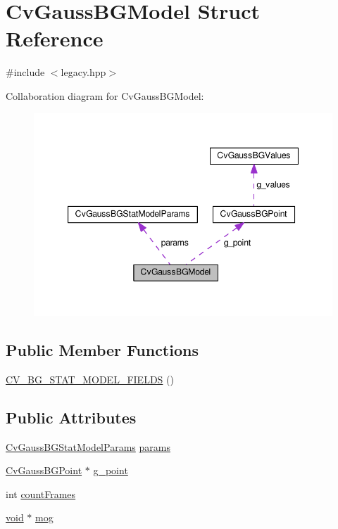 \hypertarget{structCvGaussBGModel}{\section{Cv\-Gauss\-B\-G\-Model Struct Reference}
\label{structCvGaussBGModel}
}


{\ttfamily \#include $<$legacy.\-hpp$>$}



Collaboration diagram for Cv\-Gauss\-B\-G\-Model\-:\nopagebreak
\begin{figure}[H]
\begin{center}
\leavevmode
\includegraphics[width=347pt]{structCvGaussBGModel__coll__graph}
\end{center}
\end{figure}
\subsection*{Public Member Functions}
\begin{DoxyCompactItemize}
\item 
\hyperlink{structCvGaussBGModel_aa5ecb4c83e07301bc3b6f357d6b6e8ac}{C\-V\-\_\-\-B\-G\-\_\-\-S\-T\-A\-T\-\_\-\-M\-O\-D\-E\-L\-\_\-\-F\-I\-E\-L\-D\-S} ()
\end{DoxyCompactItemize}
\subsection*{Public Attributes}
\begin{DoxyCompactItemize}
\item 
\hyperlink{structCvGaussBGStatModelParams}{Cv\-Gauss\-B\-G\-Stat\-Model\-Params} \hyperlink{structCvGaussBGModel_a4e96ac84bc0a35bfa107a6aae2b8cc32}{params}
\item 
\hyperlink{structCvGaussBGPoint}{Cv\-Gauss\-B\-G\-Point} $\ast$ \hyperlink{structCvGaussBGModel_ad195ebed0bd02c766fb6c64be83a7e16}{g\-\_\-point}
\item 
int \hyperlink{structCvGaussBGModel_ac50839a9b69f645df2510c124463bf12}{count\-Frames}
\item 
\hyperlink{legacy_8hpp_a8bb47f092d473522721002c86c13b94e}{void} $\ast$ \hyperlink{structCvGaussBGModel_a5398a6fe47cc99625cb4a33b0abbe0f2}{mog}
\end{DoxyCompactItemize}


